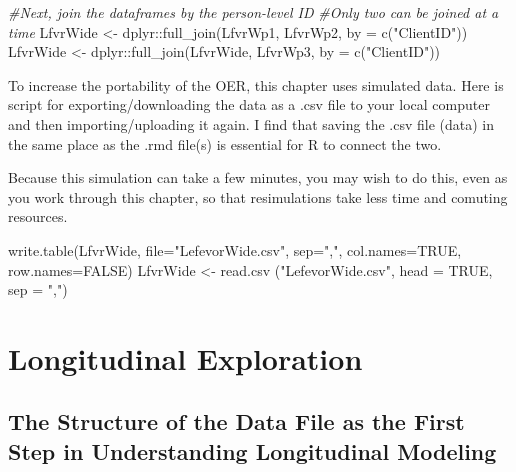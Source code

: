 \documentclass[
  english,
]{book}
\newenvironment{Shaded}{\begin{snugshade}}{\end{snugshade}}
\newcommand{\AttributeTok}[1]{\textcolor[rgb]{0.77,0.63,0.00}{#1}}
\newcommand{\CommentTok}[1]{\textcolor[rgb]{0.56,0.35,0.01}{\textit{#1}}}
\newcommand{\ConstantTok}[1]{\textcolor[rgb]{0.00,0.00,0.00}{#1}}
\newcommand{\FunctionTok}[1]{\textcolor[rgb]{0.00,0.00,0.00}{#1}}
\newcommand{\NormalTok}[1]{#1}
\newcommand{\OtherTok}[1]{\textcolor[rgb]{0.56,0.35,0.01}{#1}}
\newcommand{\SpecialCharTok}[1]{\textcolor[rgb]{0.00,0.00,0.00}{#1}}
\newcommand{\StringTok}[1]{\textcolor[rgb]{0.31,0.60,0.02}{#1}}
\begin{document}
\begin{Shaded}
\begin{Highlighting}[]
\CommentTok{\#Next, join the dataframes by the person{-}level ID}
\CommentTok{\#Only two can be joined at a time}
\NormalTok{LfvrWide }\OtherTok{\textless{}{-}}\NormalTok{ dplyr}\SpecialCharTok{::}\FunctionTok{full\_join}\NormalTok{(LfvrWp1, LfvrWp2, }\AttributeTok{by =} \FunctionTok{c}\NormalTok{(}\StringTok{"ClientID"}\NormalTok{))}
\NormalTok{LfvrWide }\OtherTok{\textless{}{-}}\NormalTok{ dplyr}\SpecialCharTok{::}\FunctionTok{full\_join}\NormalTok{(LfvrWide, LfvrWp3,  }\AttributeTok{by =} \FunctionTok{c}\NormalTok{(}\StringTok{"ClientID"}\NormalTok{))}
\end{Highlighting}
\end{Shaded}

To increase the portability of the OER, this chapter uses simulated data. Here is script for exporting/downloading the data as a .csv file to your local computer and then importing/uploading it again. I find that saving the .csv file (data) in the same place as the .rmd file(s) is essential for R to connect the two.

Because this simulation can take a few minutes, you may wish to do this, even as you work through this chapter, so that resimulations take less time and comuting resources.

\begin{Shaded}
\begin{Highlighting}[]
\FunctionTok{write.table}\NormalTok{(LfvrWide, }\AttributeTok{file=}\StringTok{"LefevorWide.csv"}\NormalTok{, }\AttributeTok{sep=}\StringTok{","}\NormalTok{, }\AttributeTok{col.names=}\ConstantTok{TRUE}\NormalTok{, }\AttributeTok{row.names=}\ConstantTok{FALSE}\NormalTok{)}
\NormalTok{LfvrWide }\OtherTok{\textless{}{-}} \FunctionTok{read.csv}\NormalTok{ (}\StringTok{"LefevorWide.csv"}\NormalTok{, }\AttributeTok{head =} \ConstantTok{TRUE}\NormalTok{, }\AttributeTok{sep =} \StringTok{","}\NormalTok{)}
\end{Highlighting}
\end{Shaded}

\hypertarget{longitudinal-exploration}{%
\section{Longitudinal Exploration}\label{longitudinal-exploration}}

\hypertarget{the-structure-of-the-data-file-as-the-first-step-in-understanding-longitudinal-modeling}{%
\subsection{The Structure of the Data File as the First Step in Understanding Longitudinal Modeling}\label{the-structure-of-the-data-file-as-the-first-step-in-understanding-longitudinal-modeling}}
\end{document}
